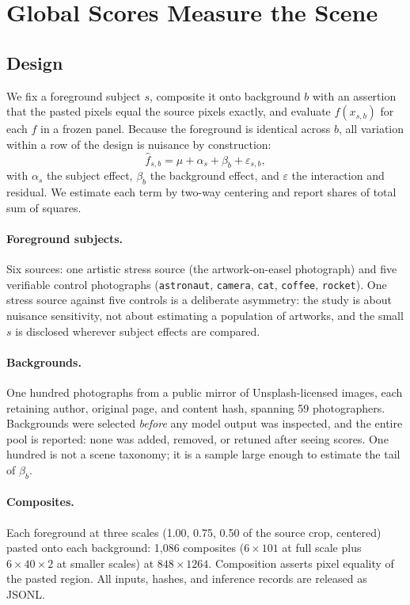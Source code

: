 \documentclass[11pt]{article}
\begin{document}
\section{Global Scores Measure the Scene}
\label{sec:sweep}
\subsection{Design}
We fix a foreground subject $s$, composite it onto background $b$ with an assertion that the pasted pixels equal the source pixels exactly, and evaluate $f(x_{s,b})$ for each $f$ in a frozen panel. Because the foreground is identical across $b$, all variation within a row of the design is nuisance by construction:
\begin{equation}
 \hat f_{s,b}=\mu+\alpha_s+\beta_b+\varepsilon_{s,b},
 \label{eq:decomp}
\end{equation}
with $\alpha_s$ the subject effect, $\beta_b$ the background effect, and $\varepsilon$ the interaction and residual. We estimate each term by two-way centering and report shares of total sum of squares.

\paragraph{Foreground subjects.} Six sources: one artistic stress source (the artwork-on-easel photograph) and five verifiable control photographs (\texttt{astronaut}, \texttt{camera}, \texttt{cat}, \texttt{coffee}, \texttt{rocket}). One stress source against five controls is a deliberate asymmetry: the study is about nuisance sensitivity, not about estimating a population of artworks, and the small $s$ is disclosed wherever subject effects are compared.

\paragraph{Backgrounds.} One hundred photographs from a public mirror of Unsplash-licensed images, each retaining author, original page, and content hash, spanning 59 photographers. Backgrounds were selected \emph{before} any model output was inspected, and the entire pool is reported: none was added, removed, or retuned after seeing scores. One hundred is not a scene taxonomy; it is a sample large enough to estimate the tail of $\beta_b$.

\paragraph{Composites.} Each foreground at three scales (1.00, 0.75, 0.50 of the source crop, centered) pasted onto each background: 1{,}086 composites ($6\times101$ at full scale plus $6\times40\times2$ at smaller scales) at $848\times1264$. Composition asserts pixel equality of the pasted region. All inputs, hashes, and inference records are released as JSONL.
\end{document}
